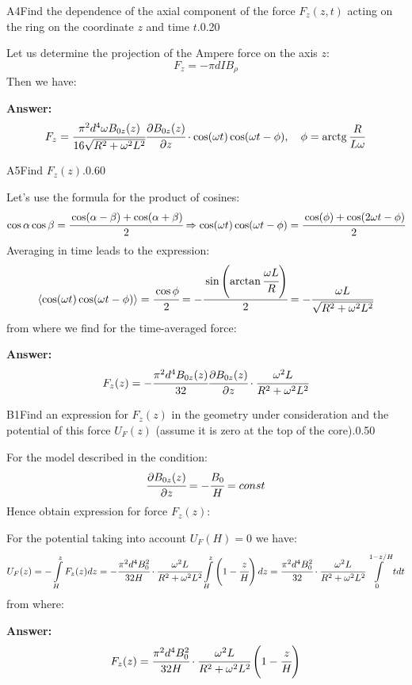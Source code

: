 \documentclass[11pt,a4paper]{article}
\begin{document}
\begin{solcard}{A4}{Find the dependence of the axial component of the force $F_z(z,t)$ acting on the ring on the coordinate $z$ and time $t$.}{0.20}

Let us determine the projection of the Ampere force on the axis $z$: $$F_z=-\pi{d}IB_\rho $$Then we have:

\par\smallskip\noindent\textbf{Answer:} $$F_z=\cfrac{\pi^2d^4\omega B_{0z}(z)}{16\sqrt{R^2+\omega^2L^2}}\cfrac{\partial{B_{0z}(z)}}{\partial{z}}\cdot \cos(\omega t)\cos(\omega t-\phi),\quad\phi=\operatorname{arctg}\frac R{L\omega} $$
\end{solcard}

\begin{solcard}{A5}{Find $F_z(z)$.}{0.60}

Let's use the formula for the product of cosines: $$\cos\alpha\cos\beta=\cfrac{\cos(\alpha-\beta)+\cos(\alpha+\beta)}{2}\Rightarrow \cos(\omega t)\cos(\omega t-\phi)=\cfrac{\cos(\phi)+\cos(2\omega t-\phi)}{2} $$Averaging in time leads to the expression: $$\langle\cos(\omega t)\cos(\omega t-\phi)\rangle=\cfrac{\cos\phi}{2}=-\cfrac{\sin\left(\arctan\cfrac{\omega L}{R}\right)}{2}=-\cfrac{\omega L}{\sqrt{R^2+\omega^2L^2}} $$from where we find for the time-averaged force:

\par\smallskip\noindent\textbf{Answer:} $$F_z(z)=-\cfrac{\pi^2d^4B_{0z}(z)}{32}\cfrac{\partial{B_{0z}(z)}}{\partial{z}}\cdot\cfrac{\omega^2L}{R^2+\omega^2L^2} $$
\end{solcard}

\begin{solcard}{B1}{Find an expression for $F_z(z)$ in the geometry under consideration and the potential of this force $U_F(z)$ (assume it is zero at the top of the core).}{0.50}

For the model described in the condition: $$\cfrac{\partial B_{0z}(z)}{\partial z}=-\cfrac{B_0}{H}=const $$Hence obtain expression for force $F_z(z)$:


For the potential taking into account $U_F(H)=0$ we have: $$U_F(z)=-\displaystyle\int\limits_H^zF_z(z)dz=-\cfrac{\pi^2d^4B^2_0}{32H}\cdot\cfrac{\omega^2L}{R^2+\omega^2L^2}\displaystyle\int\limits_H^z\left(1-\cfrac{z}{H}\right)dz=\cfrac{\pi^2d^4B^2_0}{32}\cdot\cfrac{\omega^2L}{R^2+\omega^2L^2}\displaystyle\int\limits_0^{1-z/H}tdt $$from where:

\par\smallskip\noindent\textbf{Answer:} $$F_z(z)=\cfrac{\pi^2d^4B^2_0}{32H}\cdot\cfrac{\omega^2L}{R^2+\omega^2L^2}\left(1-\cfrac{z}{H}\right) $$
\end{solcard}
\end{document}
